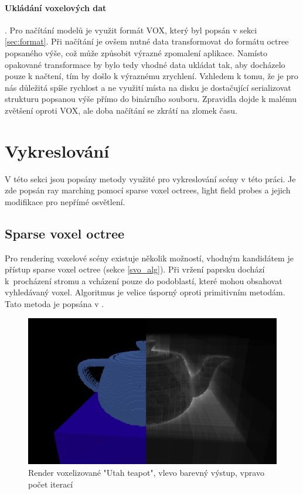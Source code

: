 \paragraph{Ukládání voxelových dat}. Pro načítání modelů je využit formát VOX, který byl popsán v sekci \ref{sec:format}. Při načítání je ovšem nutné data transformovat do formátu octree popsaného výše, což může způsobit výrazné zpomalení aplikace. Namísto opakované transformace by bylo tedy vhodné data ukládat tak, aby docházelo pouze k načtení, tím by došlo k výraznému zrychlení. Vzhledem k tomu, že je pro nás důležitá spíše rychlost a ne využití místa na disku je dostačující serializovat strukturu popsanou výše přímo do binárního souboru. Zpravidla dojde k malému zvětšení oproti VOX, ale doba načítání se zkrátí na zlomek času.

\section{Vykreslování}\label{sec:rendering}
V této sekci jsou popsány metody využité pro vykreslování scény v této práci. Je zde popsán ray marching pomocí sparse voxel octrees, light field probes a jejich modifikace pro nepřímé osvětlení.

\subsection{Sparse voxel octree}
Pro rendering voxelové scény existuje několik možností, vhodným kandidátem je přístup sparse voxel octree (sekce \ref{svo_alg}). Při vržení paprsku dochází k~procházení stromu a vcházení pouze do podoblastí, které mohou obsahovat vyhledávaný voxel. Algoritmus je velice úsporný oproti primitivním metodám. Tato metoda je popsána v \cite{Laine2011EfficientSV}.

\begin{figure}[H]
	\centering
	\includegraphics[scale=1]{obrazky-figures/color_iter_svo.png}
	\caption{Render voxelizované "Utah teapot", vlevo barevný výstup, vpravo počet iterací }
	\label{fig:octree_child}
\end{figure}


